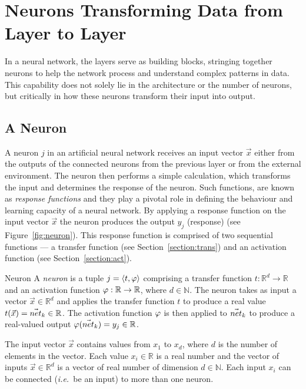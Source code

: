 \section{Neurons Transforming Data from Layer to Layer}
\label{Sec:process}

In a neural network, the layers serve as building blocks, stringing together neurons to help the network process and understand complex patterns in data. This capability does not solely lie in the architecture or the number of neurons, but critically in how these neurons transform their input into output. 
\subsection{A Neuron}
A neuron $j$ in an artificial neural network receives an input vector $\vec{x}$ either from the outputs of the connected neurons from the previous layer or from the external environment. The neuron then performs a simple calculation, which transforms the input and determines the response of the neuron. Such functions, are known as \textit{response functions} and they play a pivotal role in defining the behaviour and learning capacity of a neural network. By applying a response function on the input vector $\vec{x}$ the neuron produces the output $y_j$ (response) (see Figure~\ref{fig:neuron}). This response function is comprised of two sequential functions --- a transfer function (see Section~\ref{section:trans}) and an activation function (see Section~\ref{section:act}).


\begin{Definition}{Neuron}{}
A \emph{neuron} is a tuple $j = \langle t, \varphi\rangle$ comprising a transfer function $t:\mathbb{R}^d \to \mathbb{R}$ and an activation function $\varphi:\mathbb{R}\to \mathbb{R}$, where $d \in \mathbb{N}$. The neuron takes as input a vector $\vec{x}\in \mathbb{R}^d$ and applies the transfer function $t$ to produce a real value $t(\vec{x})=\vec{net}_{k}\in \mathbb{R}$. The activation function $\varphi$ is then applied to $\vec{net}_{k}$ to produce a real-valued output $\varphi(\vec{net}_{k})=y_j\in \mathbb{R}$.
\end{Definition}


The input vector $\vec{x}$ contains values from $x_1$ to $x_d$, where $d$ is the number of elements in the vector. Each value $x_i\in \mathbb{R}$ is a real number and the vector of inputs $\vec{x}\in \mathbb{R}^d$ is a vector of real number of dimension $d\in \mathbb{N}$. Each input $x_i$ can be connected (\textit{i.e.\ }be an input) to more than one neuron. 

